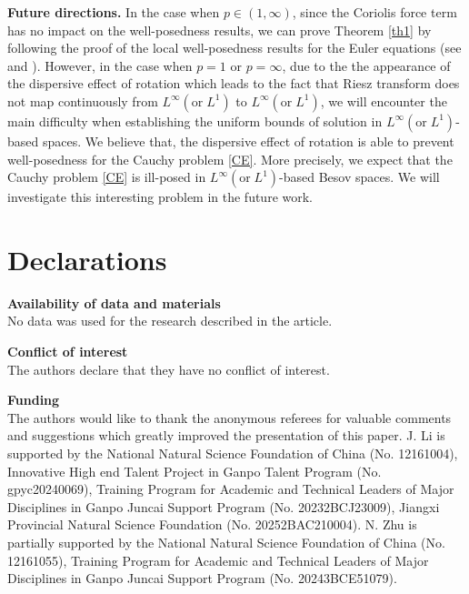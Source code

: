 \documentclass[12pt]{article}
\begin{document}
{\bf Future directions.} In the case when $p\in(1,\infty)$, since the Coriolis force term has no impact on the well-posedness results, we can prove Theorem \ref{th1} by following the proof of the local well-posedness results for the Euler equations (see \cite[Theorem 7.1 ]{B} and \cite[Theorem 1.1 ]{GLY}). However, in the case when $p=1$ or $p=\infty$, due to the the appearance of the dispersive effect of rotation which leads to the fact that Riesz transform does not map continuously
from $L^\infty(\text{or}\;L^1)$ to $L^\infty(\text{or}\;L^1)$, we will encounter the main difficulty when establishing the uniform bounds of solution in $L^\infty(\text{or}\;L^1)$-based spaces. We believe that, the dispersive effect of rotation is able to prevent well-posedness for the Cauchy problem \eqref{CE}. More precisely, we expect that the Cauchy problem \eqref{CE} is ill-posed in $L^\infty(\text{or}\;L^1)$-based Besov spaces. We will investigate this interesting problem in the future work.


\section*{Declarations}


\noindent\textbf{Availability of data and materials}\\ No data was used for the research described in the article.
\vspace*{1em}


\noindent\textbf{Conflict of interest}\\
The authors declare that they have no conflict of interest.
\vspace*{1em}


\noindent\textbf{Funding}\\
The authors would like to thank the anonymous referees for valuable comments and suggestions which greatly improved the presentation of this paper. J. Li is supported by the National Natural Science Foundation of China (No. 12161004), Innovative High end Talent Project in Ganpo Talent Program (No. gpyc20240069), Training Program for Academic and Technical Leaders of Major Disciplines in Ganpo Juncai Support Program (No. 20232BCJ23009), Jiangxi Provincial Natural Science Foundation (No. 20252BAC210004).
N. Zhu is partially supported by the National Natural Science Foundation of China (No. 12161055), Training Program for Academic and Technical Leaders of Major Disciplines in Ganpo Juncai Support Program (No. 20243BCE51079).
\end{document}
